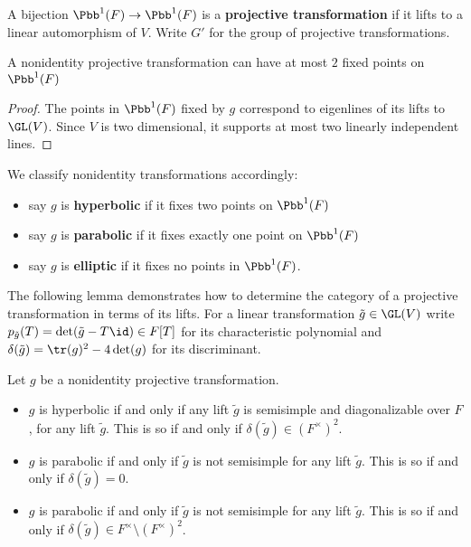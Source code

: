 \documentclass{amsart}
\begin{document}
	A bijection $\Pbb^{1}(F) \to \Pbb^{1}(F)$ is a \textbf{projective transformation} if it lifts to a linear automorphism of $V$. Write $G'$ for the group of projective transformations.
	
	
	\begin{lemma}
		A nonidentity projective transformation can have at most $2$ fixed points on $\Pbb^{1}(F)$
	\end{lemma}
	\begin{proof}
		The points in $\Pbb^{1}(F)$ fixed by $g$ correspond to eigenlines of its lifts to $\GL(V)$. Since $V$ is two dimensional, it supports at most two linearly independent lines.
	\end{proof}
	We classify nonidentity transformations accordingly:
	\begin{itemize}
		\item say $g$ is \textbf{hyperbolic} if it fixes two points on $\Pbb^{1}(F)$
		\item say $g$ is \textbf{parabolic} if it fixes exactly one point on $\Pbb^{1}(F)$
		\item say $g$ is \textbf{elliptic} if it fixes no points in $\Pbb^{1}(F)$.
	\end{itemize}
	The following lemma demonstrates how to determine the category of a projective transformation in terms of its lifts. For a linear transformation $\tilde{g} \in \GL(V)$ write $p_{\tilde{g}}(T) = \det(\tilde{g}-T \id) \in F[T]$ for its characteristic polynomial and $\delta(\tilde{g}) = \tr(g)^{2} -4 \det(g)$ for its discriminant.
	\begin{lemma}
		Let $g$ be a nonidentity projective transformation.
		\begin{itemize}
			\item $g$ is hyperbolic if and only if any lift $\tilde{g}$ is semisimple and diagonalizable over $F$, for any lift $\tilde{g}$. This is so  if and only if $\delta(\tilde{g})  \in (F^{\times})^{2}$.
			\item $g$ is parabolic if and only if $\tilde{g}$ is not semisimple for any lift $\tilde{g}$. This is so if and only if $\delta(\tilde{g})= 0$.
			\item $g$ is parabolic if and only if $\tilde{g}$ is not semisimple for any lift $\tilde{g}$. This is so if and only if $\delta(\tilde{g}) \in F^\times \setminus (F^{\times})^{2}$.
		\end{itemize}
	\end{lemma}
	
	
	
\end{document}
